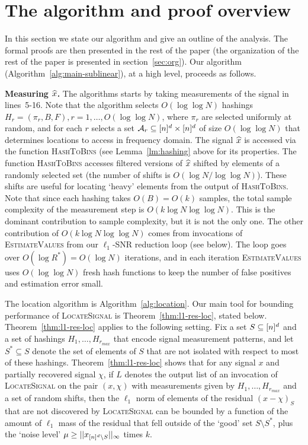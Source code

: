 \section{The algorithm and proof overview}\label{sec:sublinear}

In this section we state our algorithm and give an outline of the analysis. The formal proofs are then presented in the rest of the paper (the organization of the rest of the paper is presented in section~\ref{sec:org}).   Our algorithm (Algorithm~\ref{alg:main-sublinear}), at a high level, proceeds as follows. 

{\bf Measuring $\widehat{x}$.} The algorithms starts by taking measurements of the signal in lines~5-16. Note that the algorithm selects $O(\log\log N)$ hashings $H_r=(\pi_r, B, F), r=1,\ldots, O(\log\log N)$, where $\pi_r$ are selected uniformly at random, and for each $r$ selects a set ${\mathcal{A}}_r\subseteq {[n]^d}\times {[n]^d}$ of size $O(\log\log N)$ that determines locations to access in frequency domain. The signal $\widehat{x}$ is accessed via the function \textsc{HashToBins} (see Lemma~\ref{lm:hashing} above for its properties. The function \textsc{HashToBins} accesses filtered versions of $\widehat{x}$ shifted by elements of a randomly selected set (the number of shifts is $O(\log N/\log \log N)$). These shifts are useful for locating `heavy' elements from the output of \textsc{HashToBins}.  Note that since each hashing takes $O(B)=O(k)$ samples, the total sample complexity of the measurement step is $O(k\log N \log\log N)$. This is the dominant contribution to sample complexity, but it is not the only one. The other contribution of $O(k\log N\log\log N)$ comes from invocations of \textsc{EstimateValues} from our $\ell_1$-SNR reduction loop (see below). The loop goes over $O(\log R^*)=O(\log N)$ iterations, and in each iteration \textsc{EstimateValues} uses $O(\log\log N)$ fresh hash functions to keep the number of false positives and estimation error small.

The location algorithm is Algorithm~\ref{alg:location}.  Our main tool for bounding performance of \textsc{LocateSignal} is Theorem~\ref{thm:l1-res-loc}, stated below. Theorem~\ref{thm:l1-res-loc} applies to the following setting. Fix a set $S\subseteq {[n]^d}$ and a set of hashings $H_1,\ldots, H_{r_{max}}$ that encode signal measurement patterns, and let $S^*\subseteq S$ denote the set of elements of $S$ that are not isolated with respect to most of these hashings. Theorem~\ref{thm:l1-res-loc} shows that for any signal $x$ and partially recovered signal $\chi$, if $L$ denotes the output list of an invocation of \textsc{LocateSignal} on the pair $(x, \chi)$ with measurements given by $H_1,\ldots, H_{r_{max}}$ and a set of random shifts, then the $\ell_1$ norm of elements of the residual $(x-\chi)_S$ that are not discovered by \textsc{LocateSignal} can be bounded by a function of the amount of $\ell_1$ mass of the residual that fell outside of the `good' set $S\setminus S^*$, plus the `noise level' $\mu\geq ||x_{{[n]^d}\setminus S}||_\infty$ times $k$.


